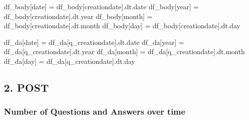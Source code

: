 \documentclass[
  letterpaper,
  DIV=11,
  numbers=noendperiod]{scrartcl}
\newenvironment{Shaded}{\begin{snugshade}}{\end{snugshade}}
\newcommand{\NormalTok}[1]{\textcolor[rgb]{0.00,0.23,0.31}{#1}}
\newcommand{\OperatorTok}[1]{\textcolor[rgb]{0.37,0.37,0.37}{#1}}
\newcommand{\StringTok}[1]{\textcolor[rgb]{0.13,0.47,0.30}{#1}}
\begin{document}
\begin{Shaded}
\begin{Highlighting}[]
\NormalTok{df\_body[}\StringTok{\textquotesingle{}date\textquotesingle{}}\NormalTok{] }\OperatorTok{=}\NormalTok{ df\_body[}\StringTok{\textquotesingle{}creationdate\textquotesingle{}}\NormalTok{].dt.date}
\NormalTok{df\_body[}\StringTok{\textquotesingle{}year\textquotesingle{}}\NormalTok{] }\OperatorTok{=}\NormalTok{ df\_body[}\StringTok{\textquotesingle{}creationdate\textquotesingle{}}\NormalTok{].dt.year}
\NormalTok{df\_body[}\StringTok{\textquotesingle{}month\textquotesingle{}}\NormalTok{] }\OperatorTok{=}\NormalTok{ df\_body[}\StringTok{\textquotesingle{}creationdate\textquotesingle{}}\NormalTok{].dt.month}
\NormalTok{df\_body[}\StringTok{\textquotesingle{}day\textquotesingle{}}\NormalTok{] }\OperatorTok{=}\NormalTok{ df\_body[}\StringTok{\textquotesingle{}creationdate\textquotesingle{}}\NormalTok{].dt.day}
\end{Highlighting}
\end{Shaded}

\begin{Shaded}
\begin{Highlighting}[]
\NormalTok{df\_da[}\StringTok{\textquotesingle{}date\textquotesingle{}}\NormalTok{]   }\OperatorTok{=}\NormalTok{ df\_da[}\StringTok{\textquotesingle{}q\_creationdate\textquotesingle{}}\NormalTok{].dt.date}
\NormalTok{df\_da[}\StringTok{\textquotesingle{}year\textquotesingle{}}\NormalTok{]   }\OperatorTok{=}\NormalTok{ df\_da[}\StringTok{\textquotesingle{}q\_creationdate\textquotesingle{}}\NormalTok{].dt.year}
\NormalTok{df\_da[}\StringTok{\textquotesingle{}month\textquotesingle{}}\NormalTok{]  }\OperatorTok{=}\NormalTok{ df\_da[}\StringTok{\textquotesingle{}q\_creationdate\textquotesingle{}}\NormalTok{].dt.month}
\NormalTok{df\_da[}\StringTok{\textquotesingle{}day\textquotesingle{}}\NormalTok{]    }\OperatorTok{=}\NormalTok{ df\_da[}\StringTok{\textquotesingle{}q\_creationdate\textquotesingle{}}\NormalTok{].dt.day}
\end{Highlighting}
\end{Shaded}

\subsection{2. POST}\label{post}

\subsubsection{Number of Questions and Answers over
time}\label{number-of-questions-and-answers-over-time}
\end{document}
